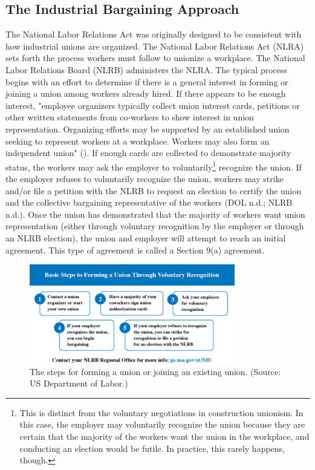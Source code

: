 \documentclass[12pt]{article}
\newcommand{\imageWidth}{0.8\textwidth}
\begin{document}
\subsection{The Industrial Bargaining Approach}

The National Labor Relations Act was originally designed to be consistent with how industrial unions are organized. The National Labor Relations Act (NLRA) sets forth the process workers must follow to unionize a workplace. The National Labor Relations Board (NLRB) administers the NLRA. The typical process begins with an effort to determine if there is a general interest in forming or joining a union among workers already hired. If there appears to be enough interest, "employee organizers typically collect union interest cards, petitions or other written statements from co-workers to show interest in union representation. Organizing efforts may be supported by an established union seeking to represent workers at a workplace. Workers may also form an independent union" (\cite["How can I form a union?"]{dolWORKCenterUnions}). If enough cards are collected to demonstrate majority status, the workers may ask the employer to voluntarily\footnote{This is distinct from the voluntary negotiations in construction unionism. In this case, the employer may voluntarily recognize the union because they are certain that the majority of the workers want the union in the workplace, and conducting an election would be futile. In practice, this rarely happens, though.}  recognize the union. If the employer refuses to voluntarily recognize the union, workers may strike and/or file a petition with the NLRB to request an election to certify the union and the collective bargaining representative of the workers (DOL n.d.; NLRB n.d.). Once the union has demonstrated that the majority of workers want union representation (either through voluntary recognition by the employer or through an NLRB election), the union and employer will attempt to reach an initial agreement. This type of agreement is called a Section 9(a) agreement.

\begin{figure}[ht]
  \centering
  \includegraphics[width=\imageWidth]{images/DOL}
  \captionsetup{justification=centering, singlelinecheck=false, margin=2cm}
  \caption[Forming a Union]{The steps for forming a union or joining an existing union. (Source: US Department of Labor.)}
  \label{fig:DOL}
\end{figure}
\end{document}
